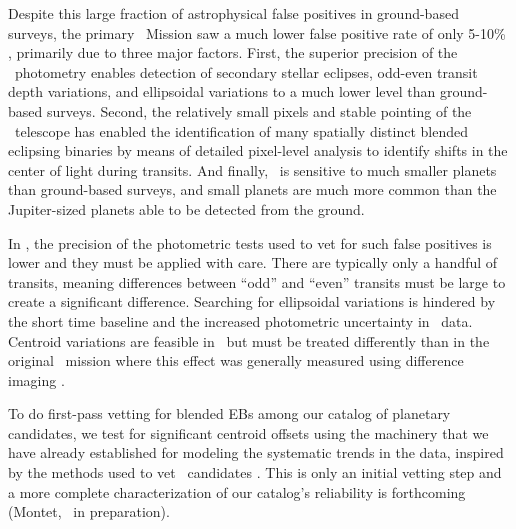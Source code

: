 Despite this large fraction of astrophysical false positives in
ground-based surveys, the primary \kepler\ Mission saw a much lower
false positive rate of only 5-10\% \citep{Morton:2011, Fressin:2013},
primarily due to three major factors.  First, the superior precision
of the \kepler\ photometry enables detection of secondary stellar
eclipses, odd-even transit depth variations, and ellipsoidal
variations \citep{Batalha:2010} to a much lower level than
ground-based surveys. Second, the relatively small pixels and stable
pointing of the \kepler\ telescope has enabled the identification of
many spatially distinct blended eclipsing binaries by means of
detailed pixel-level analysis \citep{Bryson:2013} to identify shifts
in the center of light during transits.  And finally, \kepler\ is
sensitive to much smaller planets than ground-based surveys, and small
planets are much more common than the Jupiter-sized planets able to be
detected from the ground.

In \KT, the precision of the photometric tests used to vet for such
false positives  is lower and they must be applied
with care.  There are typically only a handful of transits, meaning
differences between ``odd'' and ``even'' transits must be large to
create a significant difference. Searching for ellipsoidal variations
is hindered by the short time baseline and the increased photometric
uncertainty in \KT\ data.  Centroid variations are feasible in
\KT\ but must be treated differently than in the original
\kepler\ mission where this effect was generally measured using
difference imaging \citep{Batalha:2010, Bryson:2013}.

To do first-pass vetting for blended EBs among our catalog of
planetary candidates, we test for significant centroid offsets using
the machinery that we have already established for modeling the
systematic trends in the data, inspired by the methods used to vet
\kepler\ candidates \citep{Bryson:2013}.  This is only an initial vetting step
and a more complete characterization of our catalog's reliability is
forthcoming (Montet, \etal\ in preparation).

